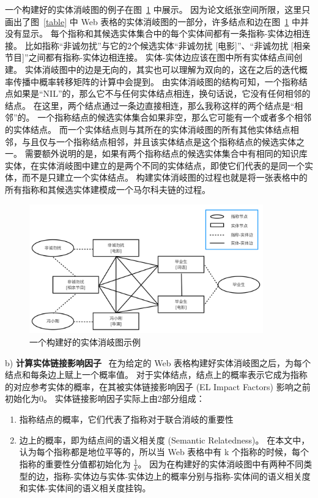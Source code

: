 一个构建好的实体消岐图的例子在图~\ref{edg} 中展示。
因为论文纸张空间所限，这里只画出了图~\ref{table} 中 Web 表格的实体消岐图的一部分，许多结点和边在图~\ref{edg} 中并没有显示。
每个指称和其候选实体集合中的每个实体间都有一条指称-实体边相连接。
比如指称``非诚勿扰''与它的2个候选实体``非诚勿扰 [电影]''、``非诚勿扰 [相亲节目]''之间都有指称-实体边相连接。
实体-实体边应该在图中所有实体结点间创建。
实体消岐图中的边是无向的，其实也可以理解为双向的，这在之后的迭代概率传播中概率转移矩阵的计算中会提到。
由实体消岐图的结构可知，一个指称结点如果是``NIL''的，那么它不与任何实体结点相连，换句话说，它没有任何相邻的结点。
在这里，两个结点通过一条边直接相连，那么我称这样的两个结点是``相邻''的。
一个指称结点的候选实体集合如果非空，那么它可能有一个或者多个相邻的实体结点。
而一个实体结点则与其所在的实体消岐图的所有其他实体结点相邻，与且仅与一个指称结点相邻，并且该实体结点是这个指称结点的候选实体之一。
需要额外说明的是，如果有两个指称结点的候选实体集合中有相同的知识库实体，在实体消岐图中建立的是两个不同的实体结点，即使它们代表的是同一个实体，而不是只建立一个实体结点。
构建实体消岐图的过程也就是将一张表格中的所有指称和其候选实体建模成一个马尔科夫链的过程。
\newline

\begin{figure}[htbp]
\centering
\includegraphics[width=0.9\textwidth]{img/edg}
\caption{一个构建好的实体消岐图示例}
\label{edg}
\end{figure}

b) \textbf{计算实体链接影响因子} \ 
在为给定的 Web 表格构建好实体消岐图之后，为每个结点和每条边上赋上一个概率值。
对于实体结点，结点上的概率表示它成为指称的对应参考实体的概率，在其被实体链接影响因子 (EL Impact Factors) 影响之前初始化为0。
实体链接影响因子实际上由2部分组成：
\begin{enumerate}[1)]
\item 指称结点的概率，它们代表了指称对于联合消岐的重要性
\item 边上的概率，即为结点间的语义相关度 (Semantic Relatedness)。
在本文中，认为每个指称都是地位平等的，所以当 Web 表格中有 k 个指称的时候，每个指称的重要性分值都初始化为 $\frac{1}{k}$。
因为在构建好的实体消岐图中有两种不同类型的边，指称-实体边与实体-实体边上的概率分别与指称-实体间的语义相关度和实体-实体间的语义相关度挂钩。
\end{enumerate}

